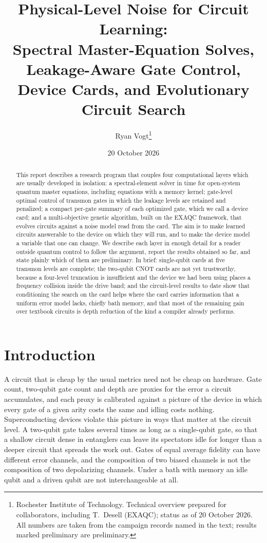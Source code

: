 \documentclass[10pt]{article}
\title{Physical-Level Noise for Circuit Learning:\\
Spectral Master-Equation Solves, Leakage-Aware Gate Control,\\
Device Cards, and Evolutionary Circuit Search}
\author{Ryan Vogt\thanks{Rochester Institute of Technology. Technical
overview prepared for collaborators, including T.~Desell (EXAQC); status as
of 20 October 2026. All numbers are taken from the campaign records named in
the text; results marked preliminary are preliminary.}}
\date{20 October 2026}
\begin{document}
\maketitle

\begin{abstract}
This report describes a research program that couples four computational
layers which are usually developed in isolation: a spectral-element solver in
time for open-system quantum master equations, including equations with a
memory kernel; gate-level optimal control of transmon gates in which the
leakage levels are retained and penalized; a compact per-gate summary of each
optimized gate, which we call a device card; and a multi-objective genetic
algorithm, built on the EXAQC framework, that evolves circuits against a noise
model read from the card. The aim is to make learned circuits answerable to
the device on which they will run, and to make the device model a variable
that one can change. We describe each layer in enough detail for a reader
outside quantum control to follow the argument, report the results obtained so
far, and state plainly which of them are preliminary. In brief: single-qubit
cards at five transmon levels are complete; the two-qubit CNOT cards are not yet
trustworthy, because a four-level truncation is insufficient and the device
we had been using places a frequency collision inside the drive band; and the
circuit-level results to date show that conditioning the search on the card
helps where the card carries information that a uniform error model lacks,
chiefly bath memory, and that most of the remaining gain over textbook circuits
is depth reduction of the kind a compiler already performs.
\end{abstract}

\section{Introduction}
\label{sec:intro}

A circuit that is cheap by the usual metrics need not be cheap on hardware.
Gate count, two-qubit gate count and depth are proxies for the error a circuit
accumulates, and each proxy is calibrated against a picture of the device in
which every gate of a given arity costs the same and idling costs nothing.
Superconducting devices violate this picture in ways that matter at the
circuit level. A two-qubit gate takes several times as long as a single-qubit
gate, so that a shallow circuit dense in entanglers can leave its spectators
idle for longer than a deeper circuit that spreads the work out. Gates of equal
average fidelity can have different error channels, and the composition of two
biased channels is not the composition of two depolarizing channels. Under a
bath with memory an idle qubit and a driven qubit are not interchangeable at
all.
\end{document}
